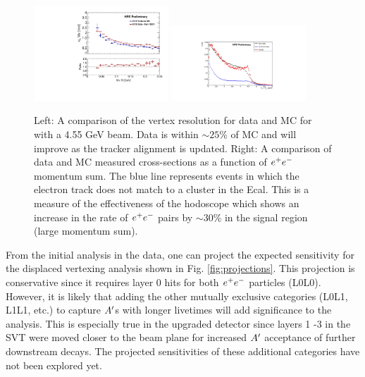 \begin{figure}
    \centering
    \includegraphics[width=0.45\textwidth]{figs/upgrades/vtxana_gbl_tightUncVChi2_vtx_InvM_vtx_svt_z_hh_sigma.pdf}
    \includegraphics[width=0.45\textwidth]{figs/upgrades/psum_2019.pdf}
    \caption{Left: A comparison of the vertex resolution for data and MC for with a 4.55 GeV beam. Data is within $\sim 25$\% of MC and will improve as the tracker alignment is updated. Right: A comparison of data and MC measured cross-sections as a function of $e^{+}e^{-}$ momentum sum. The blue line represents events in which the electron track does not match to a cluster in the Ecal. This is a measure of the effectiveness of the hodoscope which shows an increase in the rate of $e^{+}e^{-}$ pairs by $\sim$30\% in the signal region (large momentum sum).}
    \label{fig:prelimdata2019}
\end{figure}

From the initial analysis in the data, one can project the expected sensitivity for the displaced vertexing analysis shown in Fig. \ref{fig:projections}. This projection is conservative since it requires layer 0 hits for both $e^{+}e^{-}$ particles (L0L0). However, it is likely that adding the other mutually exclusive categories (L0L1, L1L1, etc.) to capture $A^\prime$s with longer livetimes will add significance to the analysis. This is especially true in the upgraded detector since layers 1 -3 in the SVT were moved closer to the beam plane for increased $A^\prime$ acceptance of further downstream decays. The projected sensitivities of these additional categories have not been explored yet.

